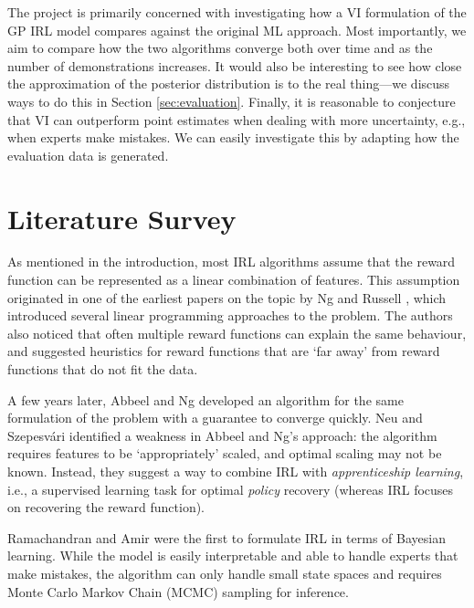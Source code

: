 \documentclass{mprop}
\theoremstyle{definition}
\begin{document}
The project is primarily concerned with investigating how a VI formulation of
the GP IRL model compares against the original ML approach. Most importantly, we
aim to compare how the two algorithms converge both over time and as the number
of demonstrations increases. It would also be interesting to see how close the
approximation of the posterior distribution is to the real thing---we discuss
ways to do this in Section \ref{sec:evaluation}. Finally, it is reasonable to
conjecture that VI can outperform point estimates when dealing with more
uncertainty, e.g., when experts make mistakes. We can easily investigate this by
adapting how the evaluation data is generated.

\section{Literature Survey} \label{literature}

As mentioned in the introduction, most IRL algorithms assume that the reward
function can be represented as a linear combination of features. This assumption
originated in one of the earliest papers on the topic by Ng and Russell
\cite{DBLP:conf/icml/NgR00}, which introduced several linear programming
approaches to the problem. The authors also noticed that often
multiple reward functions can explain the same behaviour, and suggested
heuristics for reward functions that are `far away' from reward functions that
do not fit the data.

A few years later, Abbeel and Ng \cite{DBLP:conf/icml/PieterN04} developed an
algorithm for the same formulation of the problem with a guarantee to converge
quickly. Neu and Szepesv\'ari \cite{DBLP:conf/uai/NeuS07} identified a weakness
in Abbeel and Ng's approach: the algorithm requires features to be
`appropriately' scaled, and optimal scaling may not be known. Instead, they
suggest a way to combine IRL with \emph{apprenticeship learning}, i.e., a
supervised learning task for optimal \emph{policy} recovery (whereas IRL focuses
on recovering the reward function).

Ramachandran and Amir \cite{DBLP:conf/ijcai/RamachandranA07} were the first to
formulate IRL in terms of Bayesian learning. While the model is easily
interpretable and able to handle experts that make mistakes, the algorithm can
only handle small state spaces and requires Monte Carlo Markov Chain (MCMC)
sampling for inference.
\end{document}
